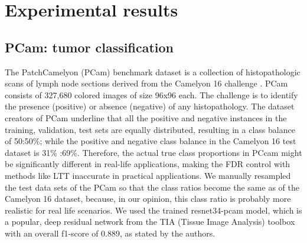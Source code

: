 \documentclass{article}
\begin{document}
\section{Experimental results}

\subsection{PCam: tumor classification}



The PatchCamelyon (PCam) benchmark dataset is a collection of histopathologic scans of lymph node sections \cite{Veeling2018-qh} derived from the Camelyon 16 challenge \cite{camelyon16}. PCam consists of 327,680 colored images of size 96x96 each. The challenge is to identify the presence (positive) or absence (negative) of any histopathology. The dataset creators of PCam underline that all the positive and negative instances in the training, validation, test sets are equally distributed, resulting in a class balance of 50:50\%; while the positive and negative class balance in the Camelyon 16 test dataset is 31\% :69\%. Therefore,  the actual true class proportions in PCcam might be significantly different in real-life applications, making the FDR control with methods like LTT inaccurate in practical applications. We manually resampled the test data sets of the PCam so that the class ratios become the same as of the Camelyon 16 dataset, because,  in our opinion,  this class ratio is probably more realistic for real life scenarios. We used the trained resnet34-pcam model, which is a popular, deep residual network from the TIA (Tissue Image Analysis) toolbox \cite{Pocock2022} with an overall f1-score of 0.889, as stated by the authors.
\end{document}
